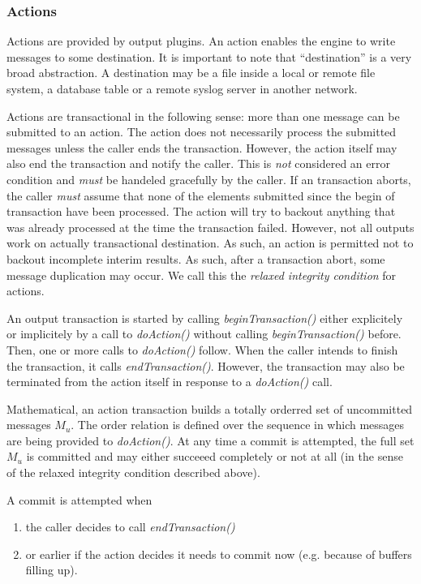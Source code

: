 \documentclass[a4paper,10pt]{article}
\begin{document}
\subsubsection{Actions}
Actions are provided by output plugins. An action enables the engine to write messages to some destination. It is important to note that ``destination'' is a very broad abstraction. A destination may be a file inside a local or remote file system, a database table or a remote syslog server in another network.

Actions are transactional in the following sense: more than one message can be submitted to an action. The action does not necessarily process the submitted messages unless the caller ends the transaction. However, the action itself may also end the transaction and notify the caller. This is \emph{not} considered an error condition and \emph{must} be handeled gracefully by the caller. If an transaction aborts, the caller \emph{must} assume that none of the elements submitted since the begin of transaction have been processed. The action will try to backout anything that was already processed at the time the transaction failed. However, not all outputs work on actually transactional destination. As such, an action is permitted not to backout incomplete interim results. As such, after a transaction abort, some message duplication may occur. We call this the \emph{relaxed integrity condition} for actions.

An output transaction is started by calling \emph{beginTransaction()} either explicitely or implicitely by a call to \emph{doAction()} without calling \emph{beginTransaction()} before. Then, one or more calls to \emph{doAction()} follow. When the caller intends to finish the transaction, it calls \emph{endTransaction()}. However, the transaction may also be terminated from the action itself in response to a \emph{doAction()} call.

Mathematical, an action transaction builds a totally orderred set of uncommitted messages $M_u$. The order relation is defined over the sequence in which messages are being provided to \emph{doAction()}. At any time a commit is attempted, the full set $M_u$ is committed and may either succeeed completely or not at all (in the sense of the relaxed integrity condition described above). 

A commit is attempted when 
\begin{enumerate}
\item the caller decides to call \emph{endTransaction()} 
\item or earlier if the action decides it needs to commit now (e.g. because of buffers filling up).
\end{enumerate}
\end{document}
